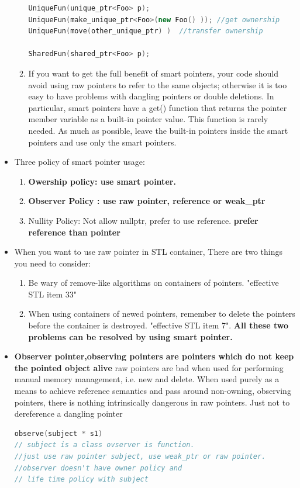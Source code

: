 \documentclass[a4paper,12pt,twoside]{book}
\begin{document}
\begin{itemize}
\begin{enumerate}
\begin{lstlisting}[frame=single, language=c++]
UniqueFun(unique_ptr<Foo> p);
UniqueFun(make_unique_ptr<Foo>(new Foo() )); //get ownership
UniqueFun(move(other_unique_ptr) )  //transfer ownership

SharedFun(shared_ptr<Foo> p);
\end{lstlisting}

\item If you want to get the full benefit of smart pointers, your code should avoid using raw pointers to refer to the same objects; otherwise it is too easy to have problems with dangling pointers or double
deletions. In particular, smart pointers have a get() function that returns the pointer member variable as a built-in pointer value. This function is rarely needed. As much as possible, leave the built-in pointers inside the smart pointers and use only the smart pointers.
\end{enumerate}


\item Three policy of smart pointer usage:
\begin{enumerate}
\item \textbf{Owership policy: use smart pointer.}
\item \textbf{Observer Policy : use raw pointer, reference or weak\_ptr}
\item Nullity Policy: Not allow nullptr, prefer to use reference. \textbf{prefer reference than pointer}
\end{enumerate}


\item When you want to use raw pointer in STL container, There are two things you need to consider:
\begin{enumerate}
\item  Be wary of remove-like algorithms on containers of pointers. "effective STL item 33"
\item When using containers of newed pointers, remember to delete the pointers before the container is destroyed. "effective STL item 7". \textbf{All these two problems can be resolved by using smart pointer.}
\end{enumerate}

\item \textbf{Observer pointer,observing pointers are pointers which do not keep the pointed object alive} raw pointers are bad when used for performing manual memory management, i.e. new and delete. When used purely as a means to achieve reference semantics and pass around non-owning, observing pointers, there is nothing intrinsically dangerous in raw pointers. Just not to dereference a dangling pointer
\begin{lstlisting}[frame=single, language=c++]
observe(subject * s1)
// subject is a class ovserver is function.
//just use raw pointer subject, use weak_ptr or raw pointer.
//observer doesn't have owner policy and
// life time policy with subject
\end{lstlisting}


\end{itemize}
\end{document}
